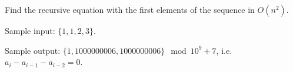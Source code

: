 Find the recursive equation with the first elements of the sequence in $O(n^2)$.

Sample input: $\{1, 1, 2, 3\}$.

Sample output: $\{1, 1000000006, 1000000006\}\mod 10^9+7$, i.e. $a_i-a_{i-1}-a_{i-2}=0$.

